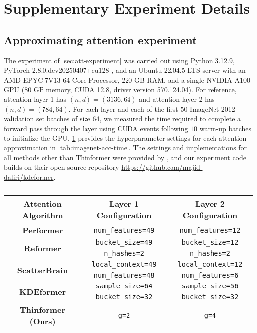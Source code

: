 \section{Supplementary Experiment Details}
\label{sec:experiment_supplement}

\subsection{Approximating attention experiment}
\label{app:attention_details}

The experiment of \cref{sec:att-experiment} was carried out using 
Python 3.12.9,  
PyTorch 2.8.0.dev20250407+cu128  
\citep{paszke2019pytorch}, and an Ubuntu 22.04.5 LTS server with an AMD EPYC 7V13 64-Core Processor, 220 GB RAM, and a single NVIDIA A100 GPU (80 GB memory, CUDA 12.8, driver version 570.124.04). 
%
For reference, attention layer 1 has $(n,d)=(3136,64)$ and attention layer 2 has $(n,d)=(784,64)$.
For each layer and each of the first $50$ ImageNet 2012 validation set batches of size $64$, we measured the time required to complete a forward pass through the layer using CUDA events following $10$ warm-up batches to initialize the GPU.
\cref{tab:imagenet-configs} provides the hyperparameter settings for each attention approximation in \cref{tab:imagenet-acc-time}. 
The settings and implementations for all methods other than Thinformer were provided by \citet{zandieh2023kdeformer}, and our experiment code builds on their open-source repository \url{https://github.com/majid-daliri/kdeformer}. 
%

\begin{table}[h!]
    \centering
    \caption{}
    \begin{tabular}{ccc}
        \toprule
        {\bf Attention Algorithm} & {\bf Layer 1 Configuration} & {\bf Layer 2 Configuration}
        \\\midrule
        \multirow{1}{*}{\bf Performer} & \verb|num_features=49| & \verb|num_features=12| 
        \\[1mm]
        \multirow{2}{*}{\bf Reformer} & \verb|bucket_size=49| & \verb|bucket_size=12| \\
        & \verb|n_hashes=2| & \verb|n_hashes=2|
        \\[1mm]
        \multirow{2}{*}{\bf ScatterBrain} & \verb|local_context=49| & \verb|local_context=12| \\
        & \verb|num_features=48| & \verb|num_features=6|
        \\[1mm]
        \multirow{2}{*}{\bf KDEformer} & \verb|sample_size=64| & \verb|sample_size=56| \\
        & \verb|bucket_size=32| & \verb|bucket_size=32|
        \\[1mm]
        \multirow{1}{*}{\bf Thinformer (Ours)} & \verb|g=2| & \verb|g=4|
        \\
        \bottomrule
    \end{tabular}
    \label{tab:imagenet-configs}
\end{table}

